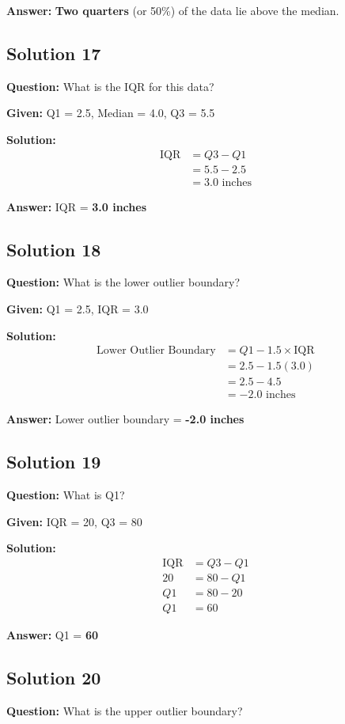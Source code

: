 \documentclass[12pt,a4paper]{article}
\begin{document}
\textbf{Answer:} \textbf{Two quarters} (or 50\%) of the data lie above the median.

\subsection*{Solution 17}
\textbf{Question:} What is the IQR for this data?

\textbf{Given:} Q1 = 2.5, Median = 4.0, Q3 = 5.5

\textbf{Solution:}
\begin{align*}
\text{IQR} &= Q3 - Q1 \\
&= 5.5 - 2.5 \\
&= 3.0 \text{ inches}
\end{align*}

\textbf{Answer:} IQR = \textbf{3.0 inches}

\subsection*{Solution 18}
\textbf{Question:} What is the lower outlier boundary?

\textbf{Given:} Q1 = 2.5, IQR = 3.0

\textbf{Solution:}
\begin{align*}
\text{Lower Outlier Boundary} &= Q1 - 1.5 \times \text{IQR} \\
&= 2.5 - 1.5(3.0) \\
&= 2.5 - 4.5 \\
&= -2.0 \text{ inches}
\end{align*}

\textbf{Answer:} Lower outlier boundary = \textbf{-2.0 inches}

\subsection*{Solution 19}
\textbf{Question:} What is Q1?

\textbf{Given:} IQR = 20, Q3 = 80

\textbf{Solution:}
\begin{align*}
\text{IQR} &= Q3 - Q1 \\
20 &= 80 - Q1 \\
Q1 &= 80 - 20 \\
Q1 &= 60
\end{align*}

\textbf{Answer:} Q1 = \textbf{60}

\subsection*{Solution 20}
\textbf{Question:} What is the upper outlier boundary?
\end{document}

